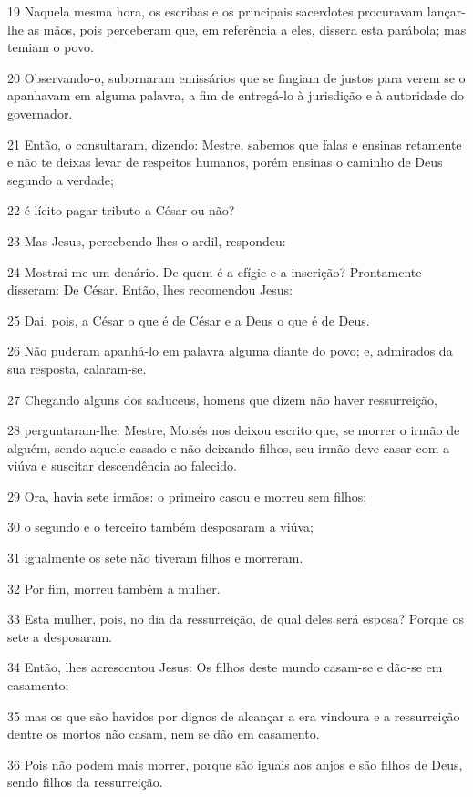 \par 19 Naquela mesma hora, os escribas e os principais sacerdotes procuravam lançar-lhe as mãos, pois perceberam que, em referência a eles, dissera esta parábola; mas temiam o povo.
\par 20 Observando-o, subornaram emissários que se fingiam de justos para verem se o apanhavam em alguma palavra, a fim de entregá-lo à jurisdição e à autoridade do governador.
\par 21 Então, o consultaram, dizendo: Mestre, sabemos que falas e ensinas retamente e não te deixas levar de respeitos humanos, porém ensinas o caminho de Deus segundo a verdade;
\par 22 é lícito pagar tributo a César ou não?
\par 23 Mas Jesus, percebendo-lhes o ardil, respondeu:
\par 24 Mostrai-me um denário. De quem é a efígie e a inscrição? Prontamente disseram: De César. Então, lhes recomendou Jesus:
\par 25 Dai, pois, a César o que é de César e a Deus o que é de Deus.
\par 26 Não puderam apanhá-lo em palavra alguma diante do povo; e, admirados da sua resposta, calaram-se.
\par 27 Chegando alguns dos saduceus, homens que dizem não haver ressurreição,
\par 28 perguntaram-lhe: Mestre, Moisés nos deixou escrito que, se morrer o irmão de alguém, sendo aquele casado e não deixando filhos, seu irmão deve casar com a viúva e suscitar descendência ao falecido.
\par 29 Ora, havia sete irmãos: o primeiro casou e morreu sem filhos;
\par 30 o segundo e o terceiro também desposaram a viúva;
\par 31 igualmente os sete não tiveram filhos e morreram.
\par 32 Por fim, morreu também a mulher.
\par 33 Esta mulher, pois, no dia da ressurreição, de qual deles será esposa? Porque os sete a desposaram.
\par 34 Então, lhes acrescentou Jesus: Os filhos deste mundo casam-se e dão-se em casamento;
\par 35 mas os que são havidos por dignos de alcançar a era vindoura e a ressurreição dentre os mortos não casam, nem se dão em casamento.
\par 36 Pois não podem mais morrer, porque são iguais aos anjos e são filhos de Deus, sendo filhos da ressurreição.
